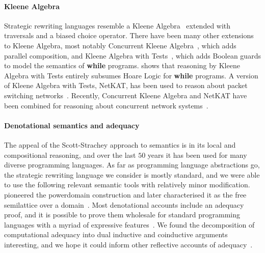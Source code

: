 \paragraph*{Kleene Algebra}
Strategic rewriting languages resemble a Kleene Algebra~\citep{DBLP:conf/lics/Kozen91} extended with traversals and a biased choice operator. There have been many other extensions to Kleene Algebra, most notably Concurrent Kleene Algebra~\citep{DBLP:journals/jlp/HoareMSW11}, which adds parallel composition, and Kleene Algebra with Tests~\citep{DBLP:journals/toplas/Kozen97}, which adds Boolean guards to model the semantics of \textbf{while} programs. \citet{DBLP:conf/lics/Kozen99} shows that  reasoning by Kleene Algebra with Tests entirely subsumes Hoare Logic for \textbf{while} programs. A version of Kleene Algebra with Tests, NetKAT, has been used to reason about packet switching networks~\citep{DBLP:conf/popl/AndersonFGJKSW14}. Recently, Concurrent Kleene Algebra and NetKAT have been combined for reasoning about concurrent network systems~\citep{DBLP:conf/esop/WagemakerFKKRS22}.

\paragraph*{Denotational semantics and adequacy}
\;The appeal of the Scott-Strachey approach to
semantics \citep{stoy1985denotational} is in its local and
compositional reasoning, and over the last $50$ years it has been used
for many diverse programming languages. As far as programming language
abstractions go, the strategic rewriting language we consider is mostly standard,
and we were able to use the following relevant semantic tools with
relatively minor modification. \citeauthor{plotkin:powerdomain}
pioneered the powerdomain construction
\citeyearpar{plotkin:powerdomain} and later characterised it as the
free semilattice over a
domain~\citep{hennessy-plotkin:plotkin-powerdomain}. Most denotational
accounts include an adequacy proof, and it is possible to prove them
wholesale for standard programming languages with a myriad of
expressive
features~\citep{SIMPSON2004207,plotkin-power:adequacy,johann-simpson-voigtlander:adequady}.
We found the decomposition of computational adequacy into dual
inductive and coinductive arguments interesting, and we hope it could
inform other reflective accounts of
adequacy~\citep{campos-levy:adequacy}.

